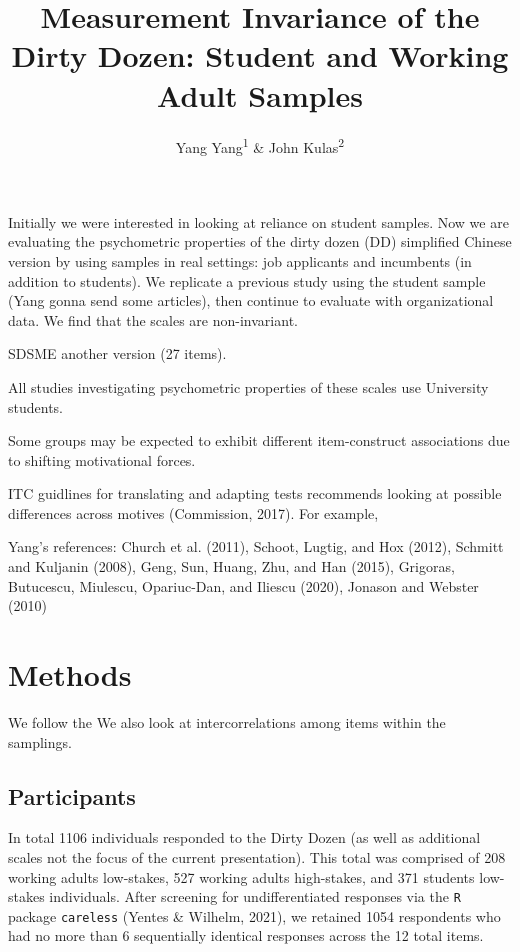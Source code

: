 \documentclass[
  english,
  man]{apa6}
\title{Measurement Invariance of the Dirty Dozen: Student and Working Adult Samples}
\author{Yang Yang\textsuperscript{1} \& John Kulas\textsuperscript{2}}
\date{}
\affiliation{\vspace{0.5cm}\textsuperscript{1} Roche\\\textsuperscript{2} Montclair State University}
\begin{document}
\maketitle

Initially we were interested in looking at reliance on student samples. Now we are evaluating the psychometric properties of the dirty dozen (DD) simplified Chinese version by using samples in real settings: job applicants and incumbents (in addition to students). We replicate a previous study using the student sample (Yang gonna send some articles), then continue to evaluate with organizational data. We find that the scales are non-invariant.

SDSME another version (27 items).

All studies investigating psychometric properties of these scales use University students.

Some groups may be expected to exhibit different item-construct associations due to shifting motivational forces.

ITC guidlines for translating and adapting tests recommends looking at possible differences across motives (Commission, 2017). For example,

Yang's references: Church et al. (2011), Schoot, Lugtig, and Hox (2012), Schmitt and Kuljanin (2008), Geng, Sun, Huang, Zhu, and Han (2015), Grigoras, Butucescu, Miulescu, Opariuc-Dan, and Iliescu (2020), Jonason and Webster (2010)

\hypertarget{methods}{%
\section{Methods}\label{methods}}

We follow the We also look at intercorrelations among items within the samplings.

\hypertarget{participants}{%
\subsection{Participants}\label{participants}}

In total 1106 individuals responded to the Dirty Dozen (as well as additional scales not the focus of the current presentation). This total was comprised of 208 working adults low-stakes, 527 working adults high-stakes, and 371 students low-stakes individuals. After screening for undifferentiated responses via the \texttt{R} package \texttt{careless} (Yentes \& Wilhelm, 2021), we retained 1054 respondents who had no more than 6 sequentially identical responses across the 12 total items.
\end{document}
